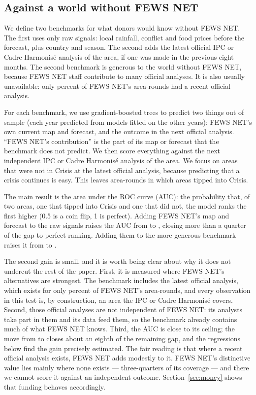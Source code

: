 \documentclass[11pt]{article}
\begin{document}
\subsection{Against a world without FEWS NET}

We define two benchmarks for what donors would know without FEWS NET. The first uses only raw signals: local rainfall, conflict and food prices before the forecast, plus country and season. The second adds the latest official IPC or Cadre Harmonis\'e analysis of the area, if one was made in the previous eight months. The second benchmark is generous to the world without FEWS NET, because FEWS NET staff contribute to many official analyses. It is also usually unavailable: only \shareWithIndependent{} percent of FEWS NET's area-rounds had a recent official analysis.

For each benchmark, we use gradient-boosted trees to predict two things out of sample (each year predicted from models fitted on the other years): FEWS NET's own current map and forecast, and the outcome in the next official analysis. ``FEWS NET's contribution'' is the part of its map or forecast that the benchmark does not predict. We then score everything against the next independent IPC or Cadre Harmonis\'e analysis of the area. We focus on areas that were not in Crisis at the latest official analysis, because predicting that a crisis continues is easy. This leaves \aucN{} area-rounds in which \aucEvents{} areas tipped into Crisis.

The main result is the area under the ROC curve (AUC): the probability that, of two areas, one that tipped into Crisis and one that did not, the model ranks the first higher (0.5 is a coin flip, 1 is perfect). Adding FEWS NET's map and forecast to the raw signals raises the AUC from \aucRaw{} to \aucRawFews{}, closing more than a quarter of the gap to perfect ranking. Adding them to the more generous benchmark raises it from \aucRawIPC{} to \aucRawIPCFews{}.

The second gain is small, and it is worth being clear about why it does not undercut the rest of the paper. First, it is measured where FEWS NET's alternatives are strongest. The benchmark includes the latest official analysis, which exists for only \shareWithIndependent{} percent of FEWS NET's area-rounds, and every observation in this test is, by construction, an area the IPC or Cadre Harmonis\'e covers. Second, those official analyses are not independent of FEWS NET: its analysts take part in them and its data feed them, so the benchmark already contains much of what FEWS NET knows. Third, the AUC is close to its ceiling; the move from \aucRawIPC{} to \aucRawIPCFews{} closes about an eighth of the remaining gap, and the regressions below find the gain precisely estimated. The fair reading is that where a recent official analysis exists, FEWS NET adds modestly to it. FEWS NET's distinctive value lies mainly where none exists --- three-quarters of its coverage --- and there we cannot score it against an independent outcome. Section~\ref{sec:money} shows that funding behaves accordingly.
\end{document}
